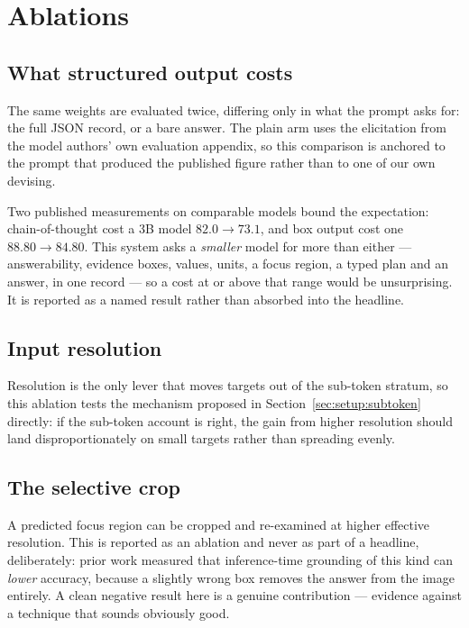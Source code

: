 \section{Ablations}
\label{sec:ablations}

\subsection{What structured output costs}



The same weights are evaluated twice, differing only in what the prompt asks for: the full JSON
record, or a bare answer. The plain arm uses the elicitation from the model authors' own evaluation
appendix, so this comparison is anchored to the prompt that produced the published figure rather
than to one of our own devising.

Two published measurements on comparable models bound the expectation: chain-of-thought cost a 3B
model $82.0 \rightarrow 73.1$, and box output cost one $88.80 \rightarrow 84.80$. This system asks a
\emph{smaller} model for more than either --- answerability, evidence boxes, values, units, a focus
region, a typed plan and an answer, in one record --- so a cost at or above that range would be
unsurprising. It is reported as a named result rather than absorbed into the headline.


\subsection{Input resolution}



Resolution is the only lever that moves targets out of the sub-token stratum, so this ablation tests
the mechanism proposed in Section~\ref{sec:setup:subtoken} directly: if the sub-token account is
right, the gain from higher resolution should land disproportionately on small targets rather than
spreading evenly.


\subsection{The selective crop}



A predicted focus region can be cropped and re-examined at higher effective resolution. This is
reported as an ablation and never as part of a headline, deliberately: prior work measured that
inference-time grounding of this kind can \emph{lower} accuracy, because a slightly wrong box
removes the answer from the image entirely. A clean negative result here is a genuine contribution
--- evidence against a technique that sounds obviously good.

